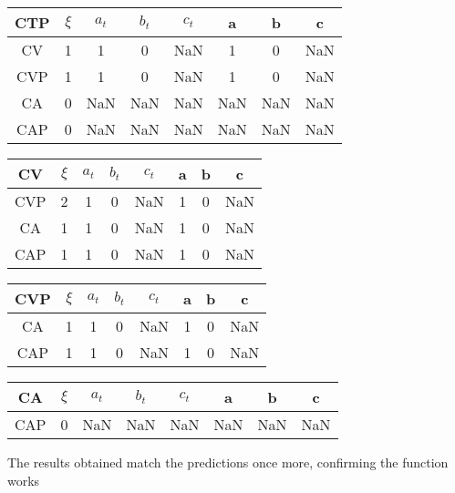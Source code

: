 \documentclass[twocolumn]{article}
\begin{document}
\begin{table}[H]
	\begin{tabular}{|c|c|c|c|c|c|c|c|}
		\hline
		CTP & $\xi $& $a_t$ & $b_t$ & $c_t$ & a & b & c \\
		\hline
		CV & 1 & 1  & 0  & NaN  & 1  & 0  & NaN \\
		\hline
		CVP & 1 & 1  & 0  & NaN  & 1  & 0  & NaN \\
		\hline
		CA & 0 & NaN  & NaN  & NaN  & NaN  & NaN  & NaN  \\
		\hline
		CAP & 0 & NaN  &  NaN & NaN  & NaN  & NaN  & NaN \\
		\hline
	\end{tabular}
\end{table}

\begin{table}[H]
	\begin{tabular}{|c|c|c|c|c|c|c|c|}
		\hline
		CV & $\xi $& $a_t$ & $b_t$ & $c_t$ & a & b & c \\
		\hline
		CVP & 2 & 1  & 0  & NaN  & 1  & 0  & NaN \\
		\hline
		CA & 1 & 1  & 0  &  NaN & 1  & 0  & NaN \\
		\hline
		CAP & 1 & 1  & 0  & NaN  & 1  & 0  & NaN \\
		\hline
	\end{tabular}
\end{table}

\begin{table}[H]
	\begin{tabular}{|c|c|c|c|c|c|c|c|}
		\hline
		CVP & $\xi $& $a_t$ & $b_t$ & $c_t$ & a & b & c \\
		\hline
		CA & 1 & 1  & 0 &  NaN & 1  & 0 &  NaN \\
		\hline
		CAP & 1 & 1  & 0  &  NaN & 1  & 0 &  NaN \\
		\hline
	\end{tabular}
\end{table}

\begin{table}[H]
	\begin{tabular}{|c|c|c|c|c|c|c|c|}
		\hline
		CA & $\xi $& $a_t$ & $b_t$ & $c_t$ & a & b & c \\
		\hline
		CAP & 0 & NaN  & NaN  & NaN & NaN  & NaN  & NaN \\
		\hline
	\end{tabular}
\end{table}

The results obtained match the predictions once more, confirming the function works
\end{document}
